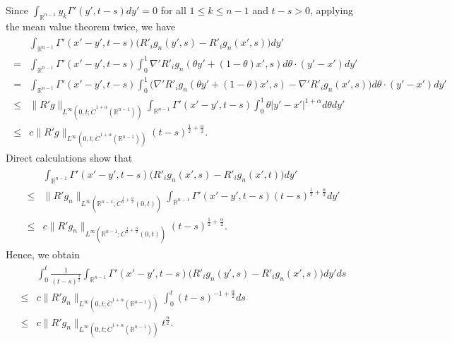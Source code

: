 \documentclass{amsart}
\numberwithin{equation}{section}
\newcommand{\na}{\nabla}
\newcommand {\al}{\alpha}
\newcommand{\Rn}{{\mathbb R}^{n-1}}
\newcommand{\te}{\theta}
\newcommand{\Ga}{\Gamma}
\begin{document}
Since $\int_{\Rn }  y_k \Ga'(y', t-s)   dy' =0 $ for all $ 1 \leq k \leq n-1$ and $t -s> 0$,
applying the mean value theorem twice,   we have 
\begin{align*}
\begin{split}
&\int_{\Rn} \Ga' (x' -y',t-s)\big(R'_i g_n(y',s)   - R'_i g_n(x',s)  \big)   dy' \\
  =&\int_{\Rn} \Ga' (x' - y',t-s)    \int_0^1  \na'R'_i g_n (\te y' + (1 -\te)x',s)  d\te  \cdot  (y' -x')   dy'\\
= &\int_{\Rn} \Ga' (x' - y',t-s)   \int_0^1  \Big(  \na'R'_i g_n (\te y' + (1 -\te)x',s)  -   \na'R'_i g_n ( x',s) \Big)  d\te  \cdot  (y' -x')    dy'\\
\leq &   \| R' g\|_{L^\infty(0, t; \dot C^{1 +\al}(\Rn))} \int_{\Rn} \Ga' (x' - y',t-s)   \int_0^1  \te   |y' -x'|^{1 +\al} d\te     dy'\\
\leq & c  \| R' g\|_{L^\infty(0, t; \dot C^{1 +\al}(\Rn))} (t-s)^{\frac12 +\frac{\al}2}.
\end{split}
\end{align*}
Direct calculations show that 
\begin{align*}
\begin{split}
&\int_{\Rn} \Ga' (x' -y',t-s)\big(R'_i g_n(x',s)   - R'_i g_n(x',t)  \big)   dy' \\
 \leq   & \| R' g_n\|_{L^\infty(\Rn; \dot C^{\frac12 +\frac{\al}2}(0,t))} \int_{\Rn} \Ga' (x' - y',t-s)(t -s)^{\frac12 +\frac{\al}2}      dy'\\
\leq &c    \| R' g_n\|_{L^\infty(\Rn; \dot C^{\frac12 +\frac{\al}2}(0,t))}(t-s)^{\frac12 +\frac{\al}2}.
\end{split}
\end{align*}
Hence, we obtain
 \begin{align*}
 \begin{split}
& \int_0^t  \frac1{(t -s)^\frac32}    \int_{\Rn}   \Ga' (x' -y', t-s) \big( R'_i g_n(y',s)   -  R'_i  g_n(x',s)    \big)  dy' ds \\
\leq & c   \| R' g_n\|_{L^\infty(0, t;  \dot C^{1 +\al}(\Rn))}    \int_0^t (t -s)^{-1 +\frac{\al}2} ds\\
\leq & c   \| R' g_n\|_{L^\infty(0, t;  \dot C^{1 +\al}(\Rn))} t^{\frac{\al}2}.
  \end{split}
  \end{align*}
\end{document}
